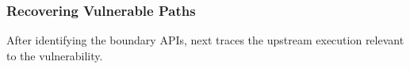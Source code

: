 


\subsubsection{Recovering Vulnerable Paths}\label{subsubsec:p1-2}


After identifying the boundary APIs, \sys next traces the upstream execution relevant to the vulnerability.

